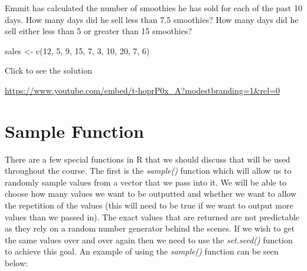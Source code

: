 \documentclass[
  letterpaper,
  DIV=11,
  numbers=noendperiod]{scrreprt}
\newenvironment{Shaded}{\begin{snugshade}}{\end{snugshade}}
\newcommand{\DecValTok}[1]{\textcolor[rgb]{0.68,0.00,0.00}{#1}}
\newcommand{\FunctionTok}[1]{\textcolor[rgb]{0.28,0.35,0.67}{#1}}
\newcommand{\NormalTok}[1]{\textcolor[rgb]{0.00,0.23,0.31}{#1}}
\newcommand{\OtherTok}[1]{\textcolor[rgb]{0.00,0.23,0.31}{#1}}
\begin{document}
\begin{tcolorbox}[enhanced jigsaw, leftrule=.75mm, arc=.35mm, coltitle=black, rightrule=.15mm, bottomrule=.15mm, toprule=.15mm, left=2mm, colbacktitle=quarto-callout-tip-color!10!white, title=\textcolor{quarto-callout-tip-color}{\faLightbulb}\hspace{0.5em}{Try it Out}, toptitle=1mm, breakable, colframe=quarto-callout-tip-color-frame, bottomtitle=1mm, titlerule=0mm, colback=white, opacityback=0, opacitybacktitle=0.6]

Emmit has calculated the number of smoothies he has sold for each of the
past 10 days. How many days did he sell less than 7.5 smoothies? How
many days did he sell either less than 5 or greater than 15 smoothies?

\begin{Shaded}
\begin{Highlighting}[]
\NormalTok{sales }\OtherTok{\textless{}{-}} \FunctionTok{c}\NormalTok{(}\DecValTok{12}\NormalTok{, }\DecValTok{5}\NormalTok{, }\DecValTok{9}\NormalTok{, }\DecValTok{15}\NormalTok{, }\DecValTok{7}\NormalTok{, }\DecValTok{3}\NormalTok{, }\DecValTok{10}\NormalTok{, }\DecValTok{20}\NormalTok{, }\DecValTok{7}\NormalTok{, }\DecValTok{6}\NormalTok{)}
\end{Highlighting}
\end{Shaded}

Click to see the solution

\url{https://www.youtube.com/embed/t-hoprP0x_A?modestbranding=1&rel=0}

\end{tcolorbox}

\section{Sample Function}\label{sample-function}

There are a few special functions in R that we should discuss that will
be used throughout the course. The first is the \emph{sample()} function
which will allow us to randomly sample values from a vector that we pass
into it. We will be able to choose how many values we want to be
outputted and whether we want to allow the repetition of the values
(this will need to be true if we want to output more values than we
passed in). The exact values that are returned are not predictable as
they rely on a random number generator behind the scenes. If we wish to
get the same values over and over again then we need to use the
\emph{set.seed()} function to achieve this goal. An example of using the
\emph{sample()} function can be seen below:
\end{document}
